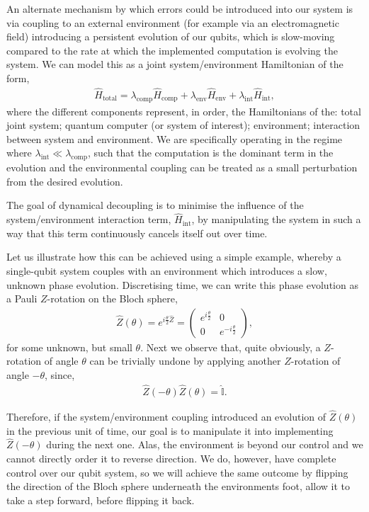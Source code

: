 An alternate mechanism by which errors could be introduced into our system is via coupling to an external environment (for example via an electromagnetic field) introducing a persistent evolution of our qubits, which is slow-moving compared to the rate at which the implemented computation is evolving the system. We can model this as a joint system/environment Hamiltonian of the form,
\begin{align}\label{eq:dyn_dec_ham}
\hat{H}_\text{total} = \lambda_\text{comp}\hat{H}_\text{comp} + \lambda_\text{env}\hat{H}_\text{env} + \lambda_\text{int}\hat{H}_\text{int},	
\end{align}
where the different components represent, in order, the Hamiltonians of the: total joint system; quantum computer (or system of interest); environment; interaction between system and environment. We are specifically operating in the regime where \mbox{$\lambda_\text{int}\ll\lambda_\text{comp}$}, such that the computation is the dominant term in the evolution and the environmental coupling can be treated as a small perturbation from the desired evolution.

The goal of dynamical decoupling is to minimise the influence of the system/environment interaction term, $\hat{H}_\text{int}$, by manipulating the system in such a way that this term continuously cancels itself out over time.

Let us illustrate how this can be achieved using a simple example, whereby a single-qubit system couples with an environment which introduces a slow, unknown phase evolution. Discretising time, we can write this phase evolution as a Pauli $Z$-rotation on the Bloch sphere,
\begin{align}
	\hat{Z}(\theta) = e^{i\frac{\theta}{2}\hat{Z}} = \left(\begin{matrix}
  e^{i\frac{\theta}{2}} & 0 \\
  0 & e^{-i\frac{\theta}{2}}
\end{matrix}\right),
\end{align}
for some unknown, but small $\theta$. Next we observe that, quite obviously, a $Z$-rotation of angle $\theta$ can be trivially undone by applying another $Z$-rotation of angle $-\theta$, since,
\begin{align}
\hat{Z}(-\theta)\hat{Z}(\theta) = \hat{\mathbb{I}}.	
\end{align}

Therefore, if the system/environment coupling introduced an evolution of $\hat{Z}(\theta)$ in the previous unit of time, our goal is to manipulate it into implementing $\hat{Z}(-\theta)$ during the next one. Alas, the environment is beyond our control and we cannot directly order it to reverse direction. We do, however, have complete control over our qubit system, so we will achieve the same outcome by flipping the direction of the Bloch sphere underneath the environments foot, allow it to take a step forward, before flipping it back.


